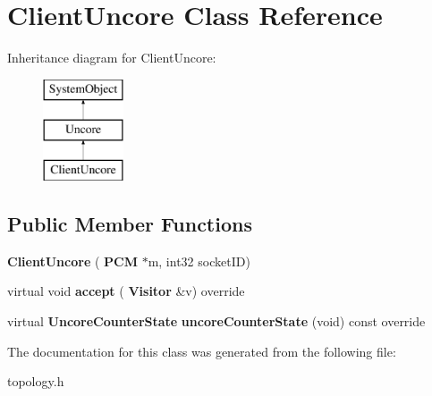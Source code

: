 \section{Client\+Uncore Class Reference}
\label{classClientUncore}
Inheritance diagram for Client\+Uncore\+:\begin{figure}[H]
\begin{center}
\leavevmode
\includegraphics[height=3.000000cm]{classClientUncore}
\end{center}
\end{figure}
\subsection*{Public Member Functions}
\begin{DoxyCompactItemize}
\item 
\mbox{\label{classClientUncore_a9cd6226cb774a1b600ccfe3f51240a19}} 
{\bfseries Client\+Uncore} (\textbf{ P\+CM} $\ast$m, int32 socket\+ID)
\item 
\mbox{\label{classClientUncore_a82350a2a3dc4bc87159be3263fe45fb1}} 
virtual void {\bfseries accept} (\textbf{ Visitor} \&v) override
\item 
\mbox{\label{classClientUncore_a4f6cf9d5f691d74d72c9edce2be9dc42}} 
virtual \textbf{ Uncore\+Counter\+State} {\bfseries uncore\+Counter\+State} (void) const override
\end{DoxyCompactItemize}


The documentation for this class was generated from the following file\+:\begin{DoxyCompactItemize}
\item 
topology.\+h\end{DoxyCompactItemize}
